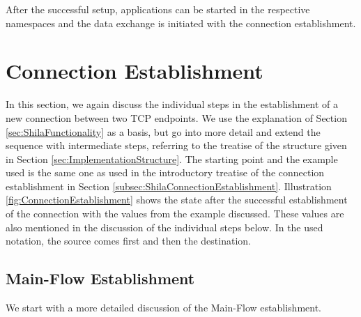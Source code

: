 After the successful setup, applications can be started in the respective namespaces and the data exchange is initiated with the connection establishment.

\section{Connection Establishment}
\label{sec:ImplementationConnectionEstablishment}

In this section, we again discuss the individual steps in the establishment of a new connection between two TCP endpoints. We use the explanation of Section \ref{sec:ShilaFunctionality} as a basis, but go into more detail and extend the sequence with intermediate steps, referring to the treatise of the structure given in Section \ref{sec:ImplementationStructure}. The starting point and the example used is the same one as used in the introductory treatise of the connection establishment in Section \ref{subsec:ShilaConnectionEstablishment}. Illustration \ref{fig:ConnectionEstablishment} shows the state after the successful establishment of the connection with the values from the example discussed. These values are also mentioned in the discussion of the individual steps below. In the used notation, the source comes first and then the destination.

\subsection*{Main-Flow Establishment}

We start with a more detailed discussion of the Main-Flow establishment. 

